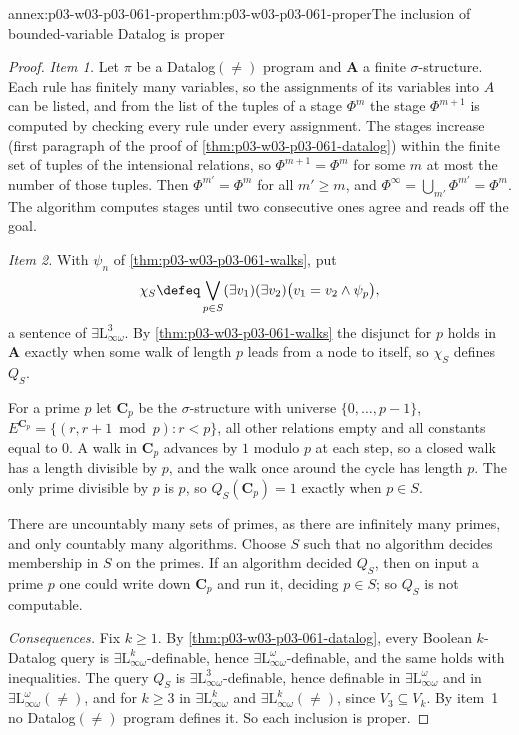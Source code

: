 \begin{annexitem}{annex:p03-w03-p03-061-proper}{thm:p03-w03-p03-061-proper}{The inclusion of bounded-variable Datalog is proper}
\begin{proof}
\emph{Item 1.} Let \(\pi\) be a Datalog\((\neq)\) program and \(\mathbf A\) a
finite \(\sigma\)-structure. Each rule has finitely many variables, so the
assignments of its variables into \(A\) can be listed, and from the list of
the tuples of a stage \(\Phi^m\) the stage \(\Phi^{m+1}\) is computed by
checking every rule under every assignment. The stages increase (first
paragraph of the proof of \cref{thm:p03-w03-p03-061-datalog}) within the
finite set of tuples of the intensional relations, so
\(\Phi^{m+1}=\Phi^m\) for some \(m\) at most the number of those tuples.
Then \(\Phi^{m'}=\Phi^m\) for all \(m'\ge m\), and
\(\Phi^\infty=\bigcup_{m'}\Phi^{m'}=\Phi^m\). The algorithm computes stages
until two consecutive ones agree and reads off the goal.

\emph{Item 2.} With \(\psi_n\) of \cref{thm:p03-w03-p03-061-walks}, put
\[
 \chi_S\defeq\bigvee_{p\in S}(\exists v_1)(\exists v_2)\bigl(v_1=v_2\wedge
 \psi_p\bigr),
\]
a sentence of \(\exists\mathrm L^3_{\infty\omega}\). By
\cref{thm:p03-w03-p03-061-walks} the disjunct for \(p\) holds in \(\mathbf A\)
exactly when some walk of length \(p\) leads from a node to itself, so
\(\chi_S\) defines \(Q_S\).

For a prime \(p\) let \(\mathbf C_p\) be the \(\sigma\)-structure with universe
\(\{0,\ldots,p-1\}\), \(E^{\mathbf C_p}=\{(r,r+1\bmod p):r<p\}\), all other
relations empty and all constants equal to \(0\). A walk in
\(\mathbf C_p\) advances by \(1\) modulo \(p\) at each step, so a closed walk
has a length divisible by \(p\), and the walk once around the cycle has
length \(p\). The only prime divisible by \(p\) is \(p\), so
\(Q_S(\mathbf C_p)=1\) exactly when \(p\in S\).

There are uncountably many sets of primes, as there are infinitely many
primes, and only countably many algorithms. Choose \(S\) such that no
algorithm decides membership in \(S\) on the primes. If an algorithm
decided \(Q_S\), then on input a prime \(p\) one could write down
\(\mathbf C_p\) and run it, deciding \(p\in S\); so \(Q_S\) is not
computable.

\emph{Consequences.} Fix \(k\ge1\). By \cref{thm:p03-w03-p03-061-datalog},
every Boolean \(k\)-Datalog query is
\(\exists\mathrm L^k_{\infty\omega}\)-definable, hence
\(\exists\mathrm L^\omega_{\infty\omega}\)-definable, and the same holds with
inequalities. The query \(Q_S\) is
\(\exists\mathrm L^3_{\infty\omega}\)-definable, hence definable in
\(\exists\mathrm L^\omega_{\infty\omega}\) and in
\(\exists\mathrm L^\omega_{\infty\omega}(\neq)\), and for \(k\ge3\) in
\(\exists\mathrm L^k_{\infty\omega}\) and
\(\exists\mathrm L^k_{\infty\omega}(\neq)\), since \(V_3\subseteq V_k\). By
item~1 no Datalog\((\neq)\) program defines it. So each inclusion is proper.
\end{proof}
\end{annexitem}

